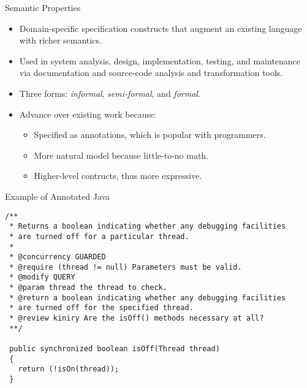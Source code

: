 \documentclass[%
final,
slideColor,
nototal,
nocolorBG,
pdf,
accumulate,
next,
]{prosper}
\begin{document}
\begin{slide}{Semantic Properties}
  \begin{itemize}
  \item Domain-specific specification constructs that augment an existing
    language with richer semantics.
  \item Used in system analysis, design, implementation, testing, and
    maintenance via documentation and source-code analysis and
    transformation tools.
  \item Three forms: \emph{informal}, \emph{semi-formal}, and
    \emph{formal}.
  \item Advance over existing work because:
    \begin{itemize}
    \item Specified as annotations, which is popular with programmers.
    \item More natural model because little-to-no math.
    \item Higher-level contructs, thus more expressive.
    \end{itemize}
  \end{itemize}
\end{slide}

\begin{slide}{Example of Annotated Java}
\tiny
\begin{verbatim}
/**
 * Returns a boolean indicating whether any debugging facilities 
 * are turned off for a particular thread.
 *
 * @concurrency GUARDED
 * @require (thread != null) Parameters must be valid.
 * @modify QUERY
 * @param thread the thread to check.
 * @return a boolean indicating whether any debugging facilities 
 * are turned off for the specified thread.
 * @review kiniry Are the isOff() methods necessary at all?
 **/
     
 public synchronized boolean isOff(Thread thread)
 {
   return (!isOn(thread));
 }
\end{verbatim}
\end{slide}
\end{document}
